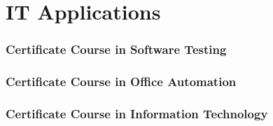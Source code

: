 \section{IT Applications} 
\begin{frame}
	\frametitle{Certificate Course in Software Testing}
\end{frame}
\begin{frame}
	\frametitle{Certificate Course in Office Automation}
\end{frame}
\begin{frame}
	\frametitle{Certificate Course in Information Technology}
\end{frame}